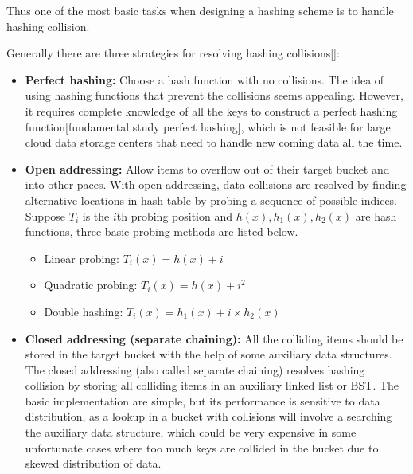 \documentclass[12pt,conference,compsoc]{IEEEtran}
\begin{document}
Thus one of the most basic tasks when designing a hashing scheme is to handle hashing collision.

Generally there are three strategies for resolving hashing collisions[]:

\begin{itemize}
    \item \textbf{Perfect hashing:} Choose a hash function with no collisions. The idea of using hashing functions that prevent the collisions seems appealing. However, it requires complete knowledge of all the keys to construct a perfect hashing function[fundamental study perfect hashing], which is not feasible for large cloud data storage centers that need to handle new coming data all the time.

    \item \textbf{Open addressing:} Allow items to overflow out of their target bucket and into other paces. With open addressing, data collisions are resolved by finding alternative locations in hash table by probing a sequence of possible indices. Suppose $T_i$ is the $i$th probing position and $h(x), h_1(x), h_2(x)$ are hash functions, three basic probing methods are listed below.
    \begin{itemize}
        \item Linear probing: $T_i(x)=h(x)+i$
        \item Quadratic probing: $T_i(x)=h(x)+i^2$
        \item Double hashing: $T_i(x)=h_1(x)+i\times h_2(x)$
    \end{itemize}

    \item \textbf{Closed addressing (separate chaining):} All the colliding items should be stored in the target bucket with the help of some auxiliary data structures. The closed addressing (also called separate chaining) resolves hashing collision by storing all colliding items in an auxiliary linked list or BST. The basic implementation are simple, but its performance is sensitive to data distribution, as a lookup in a bucket with collisions will involve a searching the auxiliary data structure, which could be very expensive in some unfortunate cases where too much keys are collided in the bucket due to skewed distribution of data.
\end{itemize}
\end{document}
